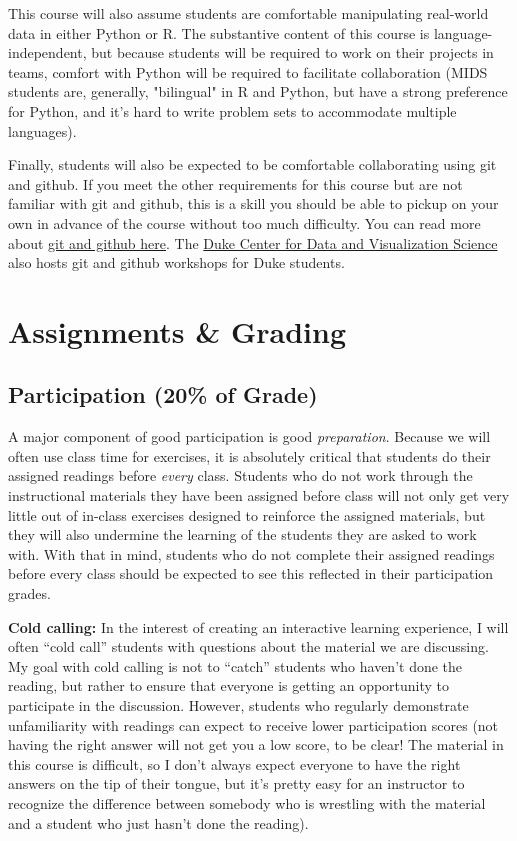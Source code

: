 \documentclass[12pt]{article}
\begin{document}
This course will also assume students are comfortable manipulating real-world data in either Python or R. The substantive content of this course is language-independent, but because students will be required to work on their projects in teams, comfort with Python will be required to facilitate collaboration (MIDS students are, generally, "bilingual" in R and Python, but have a strong preference for Python, and it's hard to write problem sets to accommodate multiple languages).

Finally, students will also be expected to be comfortable collaborating using git and github. If you meet the other requirements for this course but are not familiar with git and github, this is a skill you should be able to pickup on your own in advance of the course without too much difficulty. You can read more about \href{https://www.practicaldatascience.org/html/git_and_github.html}{git and github here}. The \href{https://library.duke.edu/data/}{Duke Center for Data and Visualization Science} also hosts git and github workshops for Duke students.


\section{Assignments \& Grading}

\subsection{Participation (20\% of Grade)}

A major component of good participation is good \emph{preparation}. Because we will often use class time for exercises, it is absolutely critical that students do their assigned readings before \emph{every} class. Students who do not work through the instructional materials they have been assigned before class will not only get very little out of in-class exercises designed to reinforce the assigned materials, but they will also undermine the learning of the students they are asked to work with. With that in mind, students who do not complete their assigned readings before every class should be expected to see this reflected in their participation grades.

\textbf{Cold calling:} In the interest of creating an interactive learning experience, I will often ``cold call'' students with questions about the material we are discussing. My goal with cold calling is not to ``catch'' students who haven't done the reading, but rather to ensure that everyone is getting an opportunity to participate in the discussion. However, students who regularly demonstrate unfamiliarity with readings can expect to receive lower participation scores (not having the right answer will not get you a low score, to be clear! The material in this course is difficult, so I don't always expect everyone to have the right answers on the tip of their tongue, but it's pretty easy for an instructor to recognize the difference between somebody who is wrestling with the material and a student who just hasn't done the reading).
\end{document}
